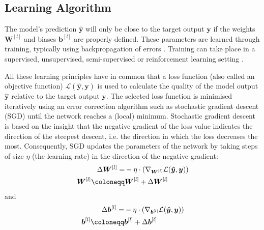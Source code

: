 \subsection{Learning Algorithm}
The model's prediction $\boldsymbol{\hat{y}}$ will only be close to the target output $\boldsymbol{y}$ if the weights $\boldsymbol{W}^{[l]}$ and biases $\boldsymbol{b}^{[l]}$ are properly defined.
These parameters are learned through training, typically using backpropagation of errors .
Training can take place in a supervised, unsupervised, semi-supervised or reinforcement learning setting .

All these learning principles have in common that a loss function  (also called an objective function) $\mathcal{L}(\boldsymbol{\hat{y}}, \boldsymbol{y})$ is used to calculate the quality of the model output $\boldsymbol{\hat{y}}$ relative to the target output $\boldsymbol{y}$.
The selected loss function is minimised iteratively using an error correction algorithm such as stochastic gradient descent (SGD) until the network reaches a (local) minimum.
Stochastic gradient descent is based on the insight that the negative gradient of the loss value indicates the direction of the steepest descent, i.e. the direction in which the loss decreases the most. Consequently, SGD updates the parameters of the network by taking steps of size $\eta$ (the learning rate) in the direction of the negative gradient:
%
\begin{align}\eqlbl{sgd}
	\begin{aligned}
		\Delta \boldsymbol{W}^{[l]} = & -\eta \cdot \left( \nabla_{\boldsymbol{W}^{[l]}} \mathcal{L}(\boldsymbol{\hat{y}}, \boldsymbol{y}) \right)\\
		\boldsymbol{W}^{[l]} \coloneqq & \boldsymbol{W}^{[l]} + \Delta \boldsymbol{W}^{[l]}
	\end{aligned}
\end{align}
%
and
%	
\begin{align}\eqlbl{sgd2}	
	\begin{aligned}
		\Delta \boldsymbol{b}^{[l]} = & -\eta \cdot \left( \nabla_{\boldsymbol{b}^{[l]}} \mathcal{L}(\boldsymbol{\hat{y}}, \boldsymbol{y}) \right)\\
		\boldsymbol{b}^{[l]} \coloneqq & \boldsymbol{b}^{[l]} + \Delta \boldsymbol{b}^{[l]}
	\end{aligned}
\end{align}
